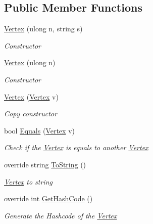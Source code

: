\subsection*{Public Member Functions}
\begin{DoxyCompactItemize}
\item 
\hyperlink{structVertex_a0619e8b3a0e56203444bbc688e4882d7}{Vertex} (ulong n, string s)
\begin{DoxyCompactList}\small\item\em Constructor \end{DoxyCompactList}\item 
\hyperlink{structVertex_af92b09621107bf55baa66090464699d8}{Vertex} (ulong n)
\begin{DoxyCompactList}\small\item\em Constructor \end{DoxyCompactList}\item 
\hyperlink{structVertex_a209f95274618f0de8d70e83dabf87d62}{Vertex} (\hyperlink{structVertex}{Vertex} v)
\begin{DoxyCompactList}\small\item\em Copy constructor \end{DoxyCompactList}\item 
bool \hyperlink{structVertex_acd8c901e67ba473b75721f129eb1f7ca}{Equals} (\hyperlink{structVertex}{Vertex} v)
\begin{DoxyCompactList}\small\item\em Check if the \hyperlink{structVertex}{Vertex} is equals to another \hyperlink{structVertex}{Vertex} \end{DoxyCompactList}\item 
override string \hyperlink{structVertex_a479e4b4c9af138826bc1841b699f5e4b}{To\+String} ()
\begin{DoxyCompactList}\small\item\em \hyperlink{structVertex}{Vertex} to string \end{DoxyCompactList}\item 
override int \hyperlink{structVertex_ac4e278a49041523187bd19779c6de994}{Get\+Hash\+Code} ()
\begin{DoxyCompactList}\small\item\em Generate the Hashcode of the \hyperlink{structVertex}{Vertex} \end{DoxyCompactList}\end{DoxyCompactItemize}
